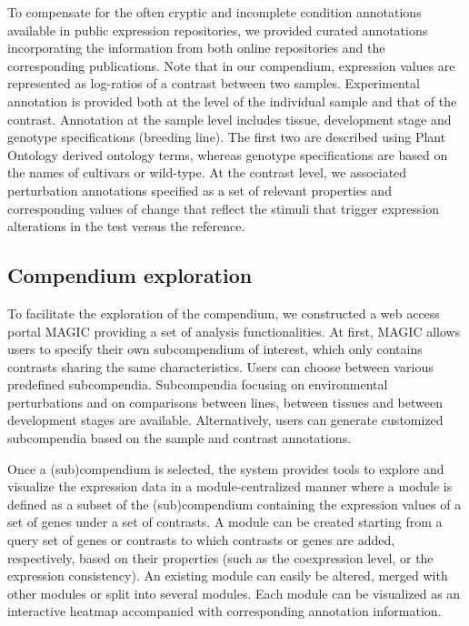 To compensate for the often cryptic and incomplete condition annotations 
available in public expression repositories, we provided curated
annotations incorporating the information from both online repositories
and the corresponding publications. Note that in our compendium, expression 
values are represented as log-ratios of a contrast between two
samples. Experimental annotation is provided both at the level of the
individual sample and that of the contrast. Annotation at the sample
level includes tissue, development stage and genotype specifications
(breeding line). The first two are described using Plant Ontology
\cite{Avraham2008} derived ontology terms, whereas genotype specifications 
are based on the names of cultivars or wild-type. At the contrast
level, we associated perturbation annotations specified as a set of relevant
properties and corresponding values of change that reflect the stimuli that
trigger expression alterations in the test versus the reference.





\subsection{Compendium exploration}

To facilitate the exploration of the compendium, we constructed a web
access portal MAGIC providing a set of analysis functionalities. At first,
MAGIC allows users to specify their own subcompendium of interest,
which only contains contrasts sharing the same characteristics. Users can
choose between various predefined subcompendia. Subcompendia focusing 
on environmental perturbations and on comparisons between lines,
between tissues and between development stages are available.
Alternatively, users can generate customized subcompendia based on
the sample and contrast annotations.

Once a (sub)compendium is selected, the system provides tools to explore 
and visualize the expression data in a module-centralized manner
where a module is defined as a subset of the (sub)compendium containing
the expression values of a set of genes under a set of contrasts. A module
can be created starting from a query set of genes or contrasts to which
contrasts or genes are added, respectively, based on their properties (such
as the coexpression level, or the expression consistency). An existing
module can easily be altered, merged with other modules or split into
several modules. Each module can be visualized as an interactive heatmap
accompanied with corresponding annotation information.


